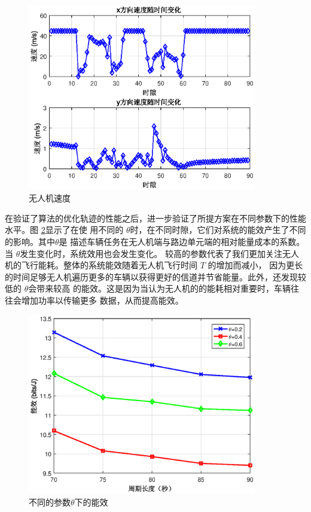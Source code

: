 \begin{figure}[H]
\centering
\includegraphics[width=10cm]{figures//chap4//无人机速度.eps}
\caption{无人机速度}
\label{无人机速度}
\end{figure}
在验证了算法的优化轨迹的性能之后，进一步验证了所提方案在不同参数下的性能水平。图 \ref{不同的参数theta下的能效}显示了在使
用不同的 $\theta$时，在不同时隙，它们对系统的能效产生了不同的影响。其中$\theta$是
描述车辆任务在无人机端与路边单元端的相对能量成本的系数。当 $\theta$发生变化时，系统效用也会发生变化。
较高的参数代表了我们更加关注无人机的飞行能耗。整体的系统能效随着无人机飞行时间 $T$ 的增加而减小，
因为更长的时间足够无人机遍历更多的车辆以获得更好的信道并节省能量。此外，还发现较低的 $\theta$会带来较高
的能效。这是因为当认为无人机的的能耗相对重要时，车辆往往会增加功率以传输更多
数据，从而提高能效。
\begin{figure}[H]
\centering
\includegraphics[width=10cm]{figures//chap4//不同的参数theta下的能效.eps}
\caption{不同的参数$\theta$下的能效}
\label{不同的参数theta下的能效}
\end{figure}



